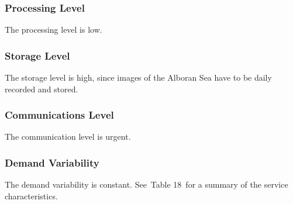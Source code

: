 \documentclass[a4paper]{article}
\begin{document}
\subsubsection[Processing Level]{ Processing
Level}
\hypertarget{Toc381777267}{}{
The processing level is low.}

\subsubsection[Storage Level]{ Storage Level}
\hypertarget{Toc381777268}{}{
The storage level is high, since images of the Alboran Sea have to be
daily recorded and stored.}

\subsubsection[Communications Level]{
Communications Level}
\hypertarget{Toc381777269}{}{
The communication level is urgent.}

\subsubsection[Demand Variability]{ Demand
Variability}
\hypertarget{Toc381777270}{}\foreignlanguage{english}{The demand
variability is constant. See\ }Table 18\foreignlanguage{english}{\ for
a summary of the service characteristics.}


\bigskip

\end{document}
